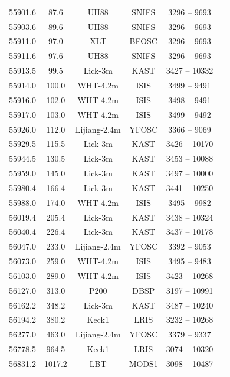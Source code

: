\documentclass[a4paper,oneside,12pt, class=Latex/Classes/PhDthesisPSnPDF, crop=false]{standalone}
\begin{document}
\begin{longtable}{cccccc}
 55901.6 & 87.6 & UH88   & SNIFS & 3296 -- 9693 & \citet{spec_UH88} \\
 55903.6 & 89.6 & UH88   & SNIFS & 3296 -- 9693 & \citet{spec_UH88} \\
 55911.0 & 97.0 & XLT   & BFOSC & 3296 -- 9693 & \citet{spec_Lijiang-2.4m} \\
 55911.6 & 97.6 & UH88   & SNIFS & 3296 -- 9693 & \citet{spec_UH88} \\
 55913.5 & 99.5 & Lick-3m  & KAST & 3427 -- 10332 & \citet{spec_Lick-3m} \\
 55914.0 & 100.0 & WHT-4.2m  & ISIS & 3499 -- 9491 & \citet{WHT_spec_100d} \\
 55916.0 & 102.0 & WHT-4.2m  & ISIS & 3498 -- 9491 & \citet{PTF_1, PTF_2} \\
 55917.0 & 103.0 & WHT-4.2m  & ISIS & 3499 -- 9492 & \citet{PTF_1, PTF_2} \\
 55926.0 & 112.0 & Lijiang-2.4m & YFOSC & 3366 -- 9069 & \citet{spec_Lijiang-2.4m} \\
 55929.5 & 115.5 & Lick-3m  & KAST & 3426 -- 10170 & \citet{spec_Lick-3m} \\
 55944.5 & 130.5 & Lick-3m  & KAST & 3453 -- 10088 & \citet{spec_Lick-3m} \\
 55959.0 & 145.0 & Lick-3m  & KAST & 3497 -- 10000 & \citet{PTF_1, PTF_2} \\
 55980.4 & 166.4 & Lick-3m  & KAST & 3441 -- 10250 & \citet{spec_Lick-3m} \\
 55988.0 & 174.0 & WHT-4.2m  & ISIS & 3495 -- 9982 & \citet{spec_WHT-4.2m} \\
 56019.4 & 205.4 & Lick-3m  & KAST & 3438 -- 10324 & \citet{spec_WHT-4.2m} \\
 56040.4 & 226.4 & Lick-3m  & KAST & 3437 -- 10178 & \citet{spec_WHT-4.2m} \\
 56047.0 & 233.0 & Lijiang-2.4m & YFOSC & 3392 -- 9053 & \citet{spec_Lijiang-2.4m} \\
 56073.0 & 259.0 & WHT-4.2m  & ISIS & 3495 -- 9483 & \citet{spec_WHT-4.2m} \\
 56103.0 & 289.0 & WHT-4.2m  & ISIS & 3423 -- 10268 & \citet{spec_WHT-4.2m} \\
 56127.0 & 313.0 & P200   & DBSP & 3197 -- 10991 & \citet{PTF_1, PTF_2} \\
 56162.2 & 348.2 & Lick-3m  & KAST & 3487 -- 10240 & \citet{spec_WHT-4.2m} \\
 56194.2 & 380.2 & Keck1  & LRIS & 3232 -- 10268 & \citet{spec_Lick-3m} \\
 56277.0 & 463.0 & Lijiang-2.4m & YFOSC & 3379 -- 9337 & \citet{spec_Lijiang-2.4m} \\
 56778.5 & 964.5 & Keck1  & LRIS & 3074 -- 10320 & \citet{spec_Lick-3m+Keck1} \\
 56831.2 & 1017.2& LBT   & MODS1 & 3098 -- 10487 & \citet{spec_LBT} \\
\end{longtable}
\normalsize
\end{document}
